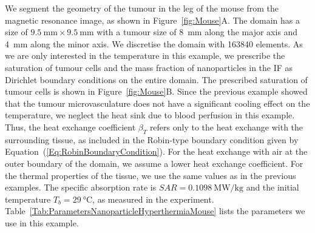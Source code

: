 \documentclass[Times1COL,AMA]{WileyNJDv5} %
\begin{document}
We segment the geometry of the tumour in the leg of the mouse from the magnetic resonance image, as shown in Figure~\ref{fig:Mouse}A.
The domain has a size of $\SI{9.5}{\milli\meter} \times \SI{9.5}{\milli\meter}$ with a tumour size of \SI{8}{\milli\meter} along the major axis and \SI{4}{\milli\meter} along the minor axis.
We discretise the domain with 163840 elements.
As we are only interested in the temperature in this example, we prescribe the saturation of tumour cells and the mass fraction of nanoparticles in the IF as Dirichlet boundary conditions on the entire domain.
The prescribed saturation of tumour cells is shown in Figure~\ref{fig:Mouse}B.
Since the previous example showed that the tumour microvasculature does not have a significant cooling effect on the temperature, we neglect the heat sink due to blood perfusion in this example.
Thus, the heat exchange coefficient $\beta_T$ refers only to the heat exchange with the surrounding tissue, as included in the Robin-type boundary condition given by Equation~(\ref{Eq:RobinBoundaryCondition}).
For the heat exchange with air at the outer boundary of the domain, we assume a lower heat exchange coefficient.
For the thermal properties of the tissue, we use the same values as in the previous examples.
The specific absorption rate is $SAR = \SI{0.1098}{\mega\watt\per\kilo\gram}$ and the initial temperature $T_{b} = \SI{29}{\celsius}$, as measured in the experiment. \cite{Cho2017}
Table~\ref{Tab:ParametersNanoparticleHyperthermiaMouse} lists the parameters we use in this example.
\end{document}
